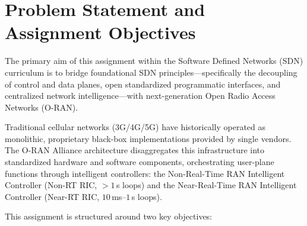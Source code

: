\documentclass[11pt,a4paper]{article}
\begin{document}
\newpage
\tableofcontents
\newpage

\section{Problem Statement and Assignment Objectives}

The primary aim of this assignment within the Software Defined Networks (SDN) curriculum is to bridge foundational SDN principles—specifically the decoupling of control and data planes, open standardized programmatic interfaces, and centralized network intelligence—with next-generation Open Radio Access Networks (O-RAN). 

Traditional cellular networks (3G/4G/5G) have historically operated as monolithic, proprietary black-box implementations provided by single vendors. The O-RAN Alliance architecture disaggregates this infrastructure into standardized hardware and software components, orchestrating user-plane functions through intelligent controllers: the Non-Real-Time RAN Intelligent Controller (Non-RT RIC, $>1$\,s loops) and the Near-Real-Time RAN Intelligent Controller (Near-RT RIC, $10$\,ms--$1$\,s loops).

This assignment is structured around two key objectives:
\end{document}
